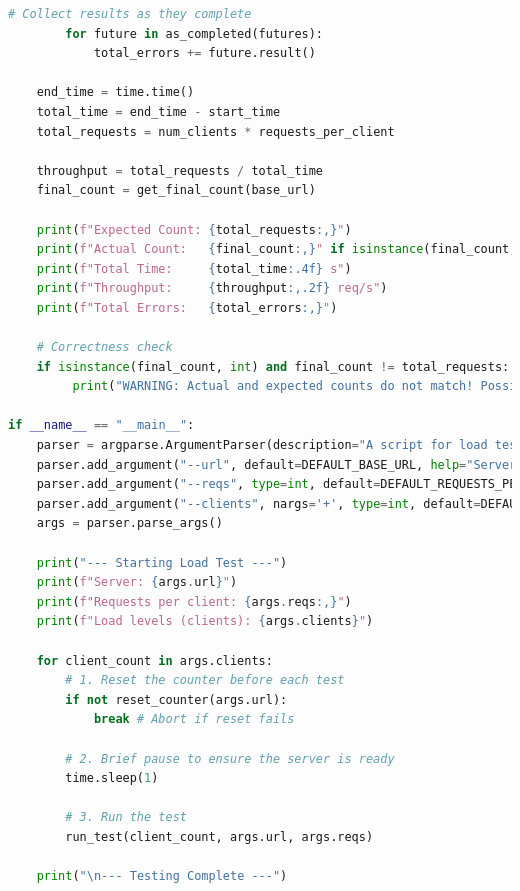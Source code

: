 \documentclass[12pt,a4paper]{article}
\begin{document}
\begin{lstlisting}[language=Python]
        # Collect results as they complete
        for future in as_completed(futures):
            total_errors += future.result()

    end_time = time.time()
    total_time = end_time - start_time
    total_requests = num_clients * requests_per_client
    
    throughput = total_requests / total_time
    final_count = get_final_count(base_url)
    
    print(f"Expected Count: {total_requests:,}")
    print(f"Actual Count:   {final_count:,}" if isinstance(final_count, int) else f"Actual Count:   {final_count}")
    print(f"Total Time:     {total_time:.4f} s")
    print(f"Throughput:     {throughput:,.2f} req/s")
    print(f"Total Errors:   {total_errors:,}")
    
    # Correctness check
    if isinstance(final_count, int) and final_count != total_requests:
         print("WARNING: Actual and expected counts do not match! Possible race condition on the server.")

if __name__ == "__main__":
    parser = argparse.ArgumentParser(description="A script for load testing a web counter.")
    parser.add_argument("--url", default=DEFAULT_BASE_URL, help="Server URL, e.g., http://localhost:8080")
    parser.add_argument("--reqs", type=int, default=DEFAULT_REQUESTS_PER_CLIENT, help="Number of requests per client")
    parser.add_argument("--clients", nargs='+', type=int, default=DEFAULT_CLIENT_LOADS, help="List of client loads, e.g., 1 5 10")
    args = parser.parse_args()

    print("--- Starting Load Test ---")
    print(f"Server: {args.url}")
    print(f"Requests per client: {args.reqs:,}")
    print(f"Load levels (clients): {args.clients}")

    for client_count in args.clients:
        # 1. Reset the counter before each test
        if not reset_counter(args.url):
            break # Abort if reset fails

        # 2. Brief pause to ensure the server is ready
        time.sleep(1)

        # 3. Run the test
        run_test(client_count, args.url, args.reqs)

    print("\n--- Testing Complete ---")
\end{lstlisting}
\end{document}
